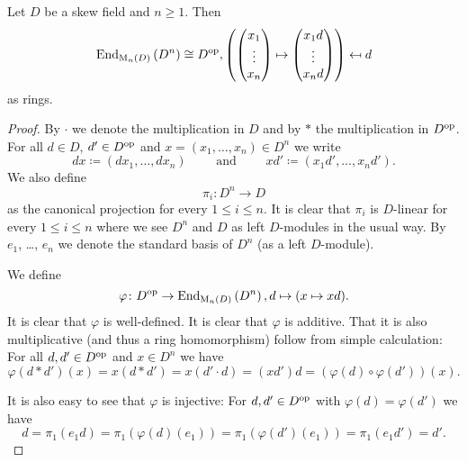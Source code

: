 \begin{lem}
  Let $D$ be a skew field and $n \geq 1$. Then
  \[
              \operatorname{End}_{\operatorname{M}_n(D)}\left(D^n\right)
    \cong     D^{\mathrm{op}},
              \left(
                        \begin{pmatrix}x_1 \\ \vdots \\ x_n\end{pmatrix}
                \mapsto \begin{pmatrix}x_1 d \\ \vdots \\ x_n d\end{pmatrix}
              \right)
    \mapsfrom d
  \]
  as rings.
\end{lem}
\begin{proof}
  By $\cdot$ we denote the multiplication in $D$ and by $*$ the multiplication in $D^{\mathrm{op}}$.
  For all $d \in D$, $d' \in D^{\mathrm{op}}$ and $x = (x_1, \dotsc, x_n) \in D^n$ we write
  \[
              d x
    \coloneqq (d x_1, \dotsc, d x_n)
    \qquad \text{ and } \qquad
              x d'
    \coloneqq (x_1 d', \dotsc, x_n d'). 
  \]
  We also define
  \[
    \pi_i \colon D^n \to D
  \]
  as the canonical projection for every $1 \leq i \leq n$.
  It is clear that $\pi_i$ is $D$-linear for every $1 \leq i \leq n$ where we see $D^n$ and $D$ as left $D$-modules in the usual way.
  By $e_1$, \dots, $e_n$ we denote the standard basis of $D^n$ (as a left $D$-module).
  
  We define
  \[
            \varphi
    \colon  D^{\mathrm{op}}
    \to     \operatorname{End}_{\operatorname{M}_n(D)}\left( D^n \right),
            d
    \mapsto (x \mapsto x d).
  \]
  It is clear that $\varphi$ is well-defined.
  It is clear that $\varphi$ is additive.
  That it is also multiplicative (and thus a ring homomorphism) follow from simple calculation:
  For all $d, d' \in D^{\mathrm{op}}$ and $x \in D^n$ we have
  \[
      \varphi(d * d')(x)
    = x (d * d')
    = x (d' \cdot d)
    = (x d') d
    = \left( \varphi(d) \circ \varphi(d') \right)(x).
  \]
  
  It is also easy to see that $\varphi$ is injective:
  For $d, d' \in D^{\mathrm{op}}$ with $\varphi(d) = \varphi(d')$ we have
  \[
      d
    = \pi_1(e_1 d)
    = \pi_1(\varphi(d)(e_1))
    = \pi_1(\varphi(d')(e_1))
    = \pi_1(e_1 d')
    = d'.
  \]
  

\end{proof}
